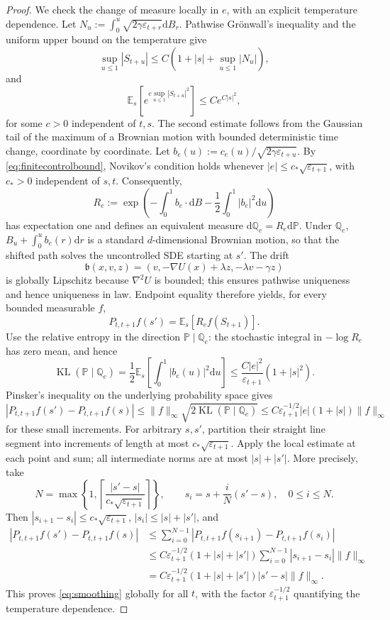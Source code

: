 \documentclass[11pt]{article}
\theoremstyle{definition}
\newcommand{\E}{\mathbb E}
\newcommand{\dd}{\mathrm d}
\newcommand{\KL}{\operatorname{KL}}
\newcommand{\eps}{\varepsilon}
\begin{document}
\begin{proof}
We check the change of measure locally in $e$, with an explicit temperature
dependence. Let
$N_u:=\int_0^u\sqrt{2\gamma\eps_{t+r}}\dd B_r$. Pathwise Gr\"{o}nwall's inequality and
the uniform upper bound on the temperature give
\[
 \sup_{u\leq1}|S_{t+u}|\leq C\left(1+|s|+\sup_{u\leq1}|N_u|\right),
\]
and
\[
 \E_s \left[e^{c\sup_{u\leq1}|S_{t+u}|^2}\right]\leq C e^{C|s|^2},
\]
for some $c>0$ independent of $t,s$. The second estimate follows from
the Gaussian tail of the maximum of a Brownian motion with bounded
deterministic time change, coordinate by coordinate.
Let $b_e(u):=c_e(u)/\sqrt{2\gamma\eps_{t+u}}$. By
\eqref{eq:finitecontrolbound}, Novikov's condition holds whenever
$|e|\leq c_*\sqrt{\eps_{t+1}}$, with $c_*>0$ independent of $s,t$.
Consequently,
\[
 R_e:=\exp\left(-\int_0^1 b_e\cdot\dd B
                         -\frac12\int_0^1|b_e|^2\dd u\right)
\]
has expectation one and defines an equivalent measure
$\dd\mathbb Q_e=R_e\dd\mathbb P$. Under $\mathbb Q_e$,
$B_u+\int_0^u b_e(r)\dd r$ is a standard $d$-dimensional Brownian motion, so that the shifted path solves the
uncontrolled SDE starting at $s'$. The drift
\[
 \mathfrak b(x,v,z)=(v,-\nabla U(x)+\lambda z,-\lambda v-\gamma z)
\]
is globally Lipschitz because $\nabla^2U$ is bounded; this ensures pathwise
uniqueness and hence uniqueness in law.
Endpoint equality therefore yields, for every bounded
measurable $f$,
\[
 P_{t,t+1}f(s')=\E_s[R_e f(S_{t+1})].
\]
Use the relative entropy in the direction $\mathbb P\mid\mathbb Q_e$:
the stochastic integral in $-\log R_e$ has zero mean, and hence
\begin{equation}\label{eq:pathentropy}
 \KL(\mathbb P\mid\mathbb Q_e)
 =\frac12\E_s\left[\int_0^1|b_e(u)|^2\dd u\right]
 \leq\frac{C|e|^2}{\eps_{t+1}}(1+|s|^2).
\end{equation}
Pinsker's inequality on the underlying probability space gives
\[
 \left|P_{t,t+1}f(s')-P_{t,t+1}f(s)\right|
 \leq\|f\|_\infty\sqrt{2\KL(\mathbb P\mid\mathbb Q_e)}
 \leq C\eps_{t+1}^{-1/2}|e|(1+|s|)\|f\|_\infty
\]
for these small increments. For arbitrary $s,s'$, partition their straight
line segment into increments of length at most
$c_*\sqrt{\eps_{t+1}}$. Apply the local estimate at each point and sum;
all intermediate norms are at most $|s|+|s'|$.
More precisely, take
\[
 N=\max\left\{1,
 \left\lceil\frac{|s'-s|}{c_*\sqrt{\eps_{t+1}}}\right\rceil\right\},
 \qquad s_i=s+\frac{i}{N}(s'-s),\quad 0\leq i\leq N.
\]
Then $|s_{i+1}-s_i|\leq c_*\sqrt{\eps_{t+1}}$,
$|s_i|\leq |s|+|s'|$, and
\begin{align*}
 \left|P_{t,t+1}f(s')-P_{t,t+1}f(s)\right|
 &\leq\sum_{i=0}^{N-1}
   \left|P_{t,t+1}f(s_{i+1})-P_{t,t+1}f(s_i)\right|\\
 &\leq C\eps_{t+1}^{-1/2}(1+|s|+|s'|)
       \sum_{i=0}^{N-1}|s_{i+1}-s_i|\|f\|_\infty\\
 &=C\eps_{t+1}^{-1/2}(1+|s|+|s'|)|s'-s|\|f\|_\infty.
\end{align*}
This proves
\eqref{eq:smoothing} globally for all $t$, with the factor
$\eps_{t+1}^{-1/2}$ quantifying the temperature dependence.


\end{proof}
\end{document}
